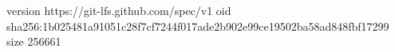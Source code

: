 version https://git-lfs.github.com/spec/v1
oid sha256:1b025481a91051c28f7cf7244f017ade2b902e99ce19502ba58ad848fbf17299
size 256661
